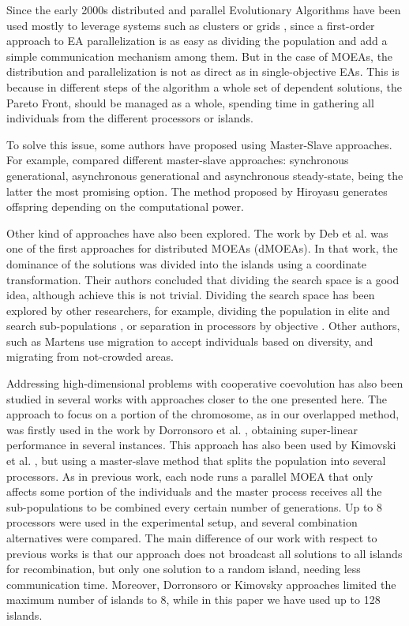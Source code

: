 \documentclass[preprint]{elsarticle}
\begin{document}
Since the early 2000s distributed and parallel Evolutionary
Algorithms have been used mostly to leverage systems such
as clusters or grids \citep{Talbi08Parallel}, since a first-order
approach to EA parallelization is as easy as dividing the population
and add a simple communication mechanism among them. But in the case of
MOEAs, the distribution and parallelization is not as direct as in
single-objective EAs. This is because in different steps of the
algorithm a whole set of dependent solutions, the Pareto Front, should
be managed as a whole, spending time in gathering all individuals from
the different processors or islands. 

To solve this issue, some authors have proposed using Master-Slave approaches. For example,  \citep{Durillo08masterslave} compared different master-slave approaches: synchronous generational, asynchronous generational and asynchronous steady-state, being the latter the most promising option. The method proposed by Hiroyasu \citep{Hiroyasu07discussion} generates offspring depending on the computational power.

Other kind of approaches have also been explored. The work by Deb et al. \citep{Deb03distributed} was one of the first approaches for distributed MOEAs (dMOEAs). In that work, the dominance of the solutions was divided into the islands using a coordinate transformation. Their authors concluded that dividing the search space is a good idea, although achieve this is not trivial. Dividing the search space has been explored by other researchers, for example, dividing the population in elite and search sub-populations \citep{Wang09parallel}, or separation in processors by objective \citep{Xiao03specialized}. Other authors, such as Martens \citep{Martens13asynchronous} use migration to accept individuals based on diversity, and migrating from not-crowded areas.

Addressing high-dimensional problems with cooperative coevolution has
also been studied in several works with approaches closer to the one
presented here. The approach to focus on a portion of the chromosome,
as in our overlapped method, was firstly used in the work by
Dorronsoro et al. \citep{Dorronsoro13superlinear}, obtaining
super-linear performance 
in several instances. This approach has also been used by Kimovski et al. \citep{Kimovski15Parallel}, but using a
master-slave method that splits the population into several processors. As in previous work, each node
runs a parallel MOEA that only affects some portion of 
the individuals and the master
process receives all the sub-populations to be combined every certain number of generations. Up to 8 processors
were used in the experimental setup, and several
combination alternatives were compared. The main difference of our work with respect to previous works is that our approach does not 
broadcast all solutions to all islands for recombination, but only one solution to a random island, needing less
communication time. Moreover, Dorronsoro or Kimovsky approaches limited the maximum number of islands to 8, while in this paper we have
used up to 128 islands. 
\end{document}

